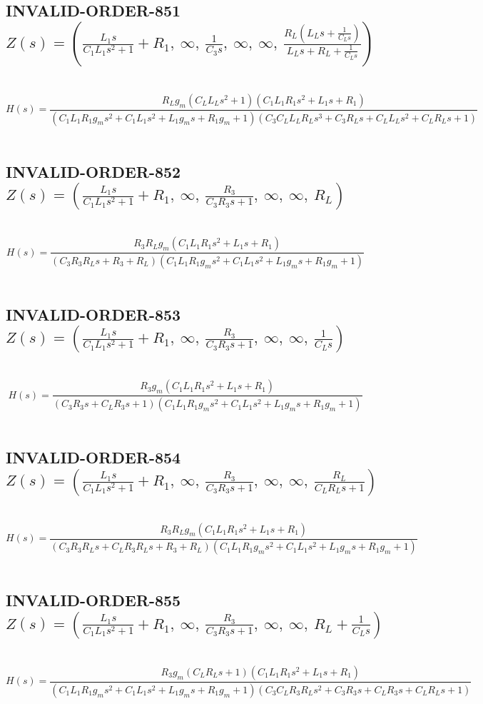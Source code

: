 \documentclass{article}
\begin{document}
\subsection{INVALID-ORDER-851 $Z(s) = \left( \frac{L_{1} s}{C_{1} L_{1} s^{2} + 1} + R_{1}, \  \infty, \  \frac{1}{C_{3} s}, \  \infty, \  \infty, \  \frac{R_{L} \left(L_{L} s + \frac{1}{C_{L} s}\right)}{L_{L} s + R_{L} + \frac{1}{C_{L} s}}\right)$ } \ 
\textbf{\[H(s) = \frac{R_{L} g_{m} \left(C_{L} L_{L} s^{2} + 1\right) \left(C_{1} L_{1} R_{1} s^{2} + L_{1} s + R_{1}\right)}{\left(C_{1} L_{1} R_{1} g_{m} s^{2} + C_{1} L_{1} s^{2} + L_{1} g_{m} s + R_{1} g_{m} + 1\right) \left(C_{3} C_{L} L_{L} R_{L} s^{3} + C_{3} R_{L} s + C_{L} L_{L} s^{2} + C_{L} R_{L} s + 1\right)}\] } \ 
\subsection{INVALID-ORDER-852 $Z(s) = \left( \frac{L_{1} s}{C_{1} L_{1} s^{2} + 1} + R_{1}, \  \infty, \  \frac{R_{3}}{C_{3} R_{3} s + 1}, \  \infty, \  \infty, \  R_{L}\right)$ } \ 
\textbf{\[H(s) = \frac{R_{3} R_{L} g_{m} \left(C_{1} L_{1} R_{1} s^{2} + L_{1} s + R_{1}\right)}{\left(C_{3} R_{3} R_{L} s + R_{3} + R_{L}\right) \left(C_{1} L_{1} R_{1} g_{m} s^{2} + C_{1} L_{1} s^{2} + L_{1} g_{m} s + R_{1} g_{m} + 1\right)}\] } \ 
\subsection{INVALID-ORDER-853 $Z(s) = \left( \frac{L_{1} s}{C_{1} L_{1} s^{2} + 1} + R_{1}, \  \infty, \  \frac{R_{3}}{C_{3} R_{3} s + 1}, \  \infty, \  \infty, \  \frac{1}{C_{L} s}\right)$ } \ 
\textbf{\[H(s) = \frac{R_{3} g_{m} \left(C_{1} L_{1} R_{1} s^{2} + L_{1} s + R_{1}\right)}{\left(C_{3} R_{3} s + C_{L} R_{3} s + 1\right) \left(C_{1} L_{1} R_{1} g_{m} s^{2} + C_{1} L_{1} s^{2} + L_{1} g_{m} s + R_{1} g_{m} + 1\right)}\] } \ 
\subsection{INVALID-ORDER-854 $Z(s) = \left( \frac{L_{1} s}{C_{1} L_{1} s^{2} + 1} + R_{1}, \  \infty, \  \frac{R_{3}}{C_{3} R_{3} s + 1}, \  \infty, \  \infty, \  \frac{R_{L}}{C_{L} R_{L} s + 1}\right)$ } \ 
\textbf{\[H(s) = \frac{R_{3} R_{L} g_{m} \left(C_{1} L_{1} R_{1} s^{2} + L_{1} s + R_{1}\right)}{\left(C_{3} R_{3} R_{L} s + C_{L} R_{3} R_{L} s + R_{3} + R_{L}\right) \left(C_{1} L_{1} R_{1} g_{m} s^{2} + C_{1} L_{1} s^{2} + L_{1} g_{m} s + R_{1} g_{m} + 1\right)}\] } \ 
\subsection{INVALID-ORDER-855 $Z(s) = \left( \frac{L_{1} s}{C_{1} L_{1} s^{2} + 1} + R_{1}, \  \infty, \  \frac{R_{3}}{C_{3} R_{3} s + 1}, \  \infty, \  \infty, \  R_{L} + \frac{1}{C_{L} s}\right)$ } \ 
\textbf{\[H(s) = \frac{R_{3} g_{m} \left(C_{L} R_{L} s + 1\right) \left(C_{1} L_{1} R_{1} s^{2} + L_{1} s + R_{1}\right)}{\left(C_{1} L_{1} R_{1} g_{m} s^{2} + C_{1} L_{1} s^{2} + L_{1} g_{m} s + R_{1} g_{m} + 1\right) \left(C_{3} C_{L} R_{3} R_{L} s^{2} + C_{3} R_{3} s + C_{L} R_{3} s + C_{L} R_{L} s + 1\right)}\] } \ 
\end{document}
